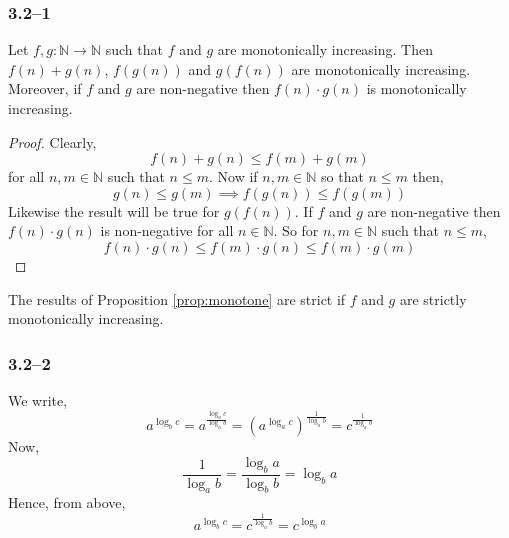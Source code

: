 \subsubsection*{3.2--1}

\begin{proposition}
	\label{prop:monotone}
	Let $f,g:\mathbb{N}\to\mathbb{N}$ such that $f$ and $g$ are monotonically increasing. Then $f(n)+g(n)$, $f(g(n))$ and $g(f(n))$ are monotonically increasing. Moreover, if $f$ and $g$ are non-negative then $f(n)\cdot g(n)$ is monotonically increasing.
\end{proposition}

\begin{proof}
	Clearly,
	\begin{equation*}
		f(n)+g(n)\leq f(m)+g(m)
	\end{equation*}
	for all $n,m\in\mathbb{N}$ such that $n\leq m$. Now if $n,m\in\mathbb{N}$ so that $n\leq m$ then,
	\begin{equation*}
		g(n)\leq g(m)\implies f(g(n))\leq f(g(m))
	\end{equation*}
	Likewise the result will be true for $g(f(n))$. If $f$ and $g$ are non-negative then $f(n)\cdot g(n)$ is non-negative for all $n\in\mathbb{N}$. So for $n,m\in\mathbb{N}$ such that $n\leq m$,
	\begin{equation*}
		f(n)\cdot g(n)\leq f(m)\cdot g(n)\leq f(m)\cdot g(m)
	\end{equation*}
\end{proof}

\begin{remark}
	\label{rem:monotone}
	The results of Proposition \ref{prop:monotone} are strict if $f$ and $g$ are strictly monotonically increasing.
\end{remark}

\subsubsection*{3.2--2}

We write,
\begin{equation*}
	a^{\log_{b}c} = a^{\frac{\log_{a}c}{\log_{a}b}} = \left(a^{\log_{a}c}\right)^{\frac{1}{\log_{a}b}} = c^{\frac{1}{\log_{a}b}}
\end{equation*}
Now,
\begin{equation*}
	\frac{1}{\log_{a}b}=\frac{\log_{b}a}{\log_{b}b}=\log_{b}a
\end{equation*}
Hence, from above,
\begin{equation*}
	a^{\log_{b}c} = c^{\frac{1}{\log_{a}b}}=c^{\log_{b}a}
\end{equation*}


